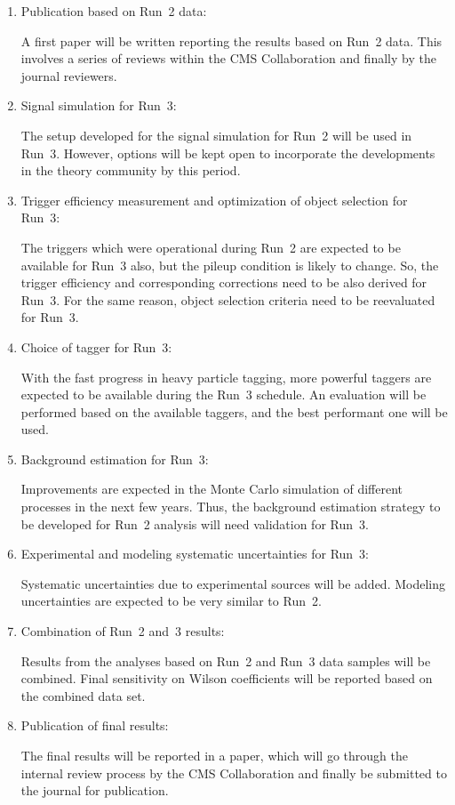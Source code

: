\documentclass[a4paper,11pt]{article}
\begin{document}
\begin{enumerate}
\item Publication based on Run~2 data:

A first paper will be written reporting the results based on Run~2 data. This involves a series of reviews within the CMS Collaboration and finally by the journal reviewers. 

\item Signal simulation for Run~3:

The setup developed for the signal simulation for Run~2 will be used in Run~3. However, options will be kept open to incorporate the developments in the theory community by this period. 

\item Trigger efficiency measurement and optimization of object selection for Run~3: 

The triggers which were operational during Run~2 are expected to be available for Run~3 also, but the pileup condition is likely to change. So, the trigger efficiency and corresponding corrections need to be also derived for Run~3. 
For the same reason, object selection criteria need to be reevaluated for Run~3. 

\item Choice of \PH tagger for Run~3:

With the fast progress in heavy particle tagging, more powerful taggers are expected to be available during the Run~3 schedule. An evaluation will be performed based on the available taggers, and the best performant one will be used. 

\item Background estimation for Run~3:

Improvements are expected in the Monte Carlo simulation of different processes in the next few years. Thus, the background estimation strategy to be developed for Run~2 analysis will need validation for Run~3.

\item Experimental and modeling systematic uncertainties for Run~3:

Systematic uncertainties due to experimental sources will be added. Modeling uncertainties are expected to be very similar to Run~2.

\item Combination of Run~2 and~3 results:

Results from the analyses based on Run~2 and Run~3 data samples will be combined. Final sensitivity on Wilson coefficients will be reported based on the combined data set. 

\item Publication of final results:

The final results will be reported in a paper, which will go through the internal review process by the CMS Collaboration and finally be submitted to the journal for publication. 

\end{enumerate}
\end{document}
